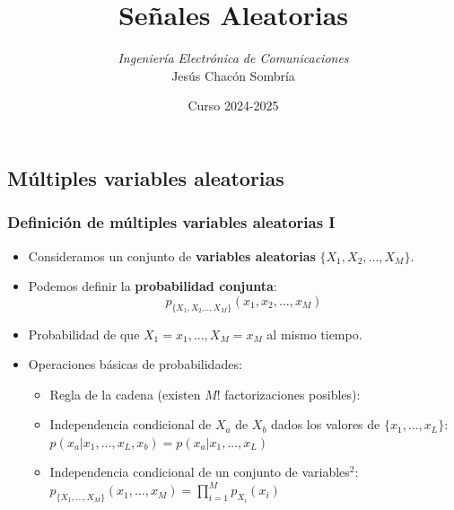 \documentclass{beamer}
\title[Procesamiento de Señales]{Señales Aleatorias}
\author[Jesús Chacón Sombría] {%
 	\textit{Ingeniería Electrónica de Comunicaciones}\\
 	\vspace{0.6cm}%
	\small Jesús Chacón Sombría%
}%
\institute[DACYA. UCM] {%
	\footnotesize  Departamento de Arquitectura de Computadores y Automática\\
  Universidad Complutense de Madrid
}
\date[Señales Aleatorias] %
{\footnotesize Curso 2024-2025}%
\newcommand{\MyLogo}{%
\begin{textblock}{14}(116.0,0.6)
  \pgfuseimage{logo}
\end{textblock}
}
\numberwithin{section}{part}
\begin{document}
\begin{frame}
  \titlepage
\end{frame}

\newcommand*\oldmacro{}%
\let\oldmacro\insertshorttitle%
\renewcommand*\insertshorttitle{%
\oldmacro\hfill%
}

\AtBeginSection[]{}

\AtBeginSubsection[]{}



\subsection{Múltiples variables aleatorias}



\begin{frame}
  \frametitle{Definición de múltiples variables aleatorias I}
  \vspace{-0.2cm}
  \footnotesize
  \begin{itemize}
    \item Consideramos un conjunto de \textbf{variables aleatorias} $\{X_1,X_2,\dots,X_M\}$. 
    \item Podemos definir la \textbf{probabilidad conjunta}:
    \[
    p_{\{X_1,X_2\dots,X_M\}}(x_1,x_2,\dots,x_M)
    \]
    \item Probabilidad de que $X_1=x_1,...,X_M=x_M$ al mismo tiempo.
    \item Operaciones básicas de probabilidades:
    \begin{itemize}
      \scriptsize
    \item Regla de la cadena (existen $M!$ factorizaciones posibles): 
    \vspace{0.1cm}
    \item Independencia condicional de $X_a$ de $X_b$ dados los valores de $\{x_1,\dots,x_L\}$:
    \hspace{0.2cm}$p(x_a|x_1,\dots,x_L,x_b)=p(x_a|x_1,\dots,x_L)$
    \item Independencia condicional de un conjunto de variables$^2$:
    \vspace{0.1cm}
    \hspace{0.2cm}$p_{\{X_1,\dots,X_M\}}(x_1,\dots,x_M)=\prod_{i=1}^M p_{X_i}(x_i)$

    \end{itemize}
  \end{itemize}


\end{frame}
\end{document}
